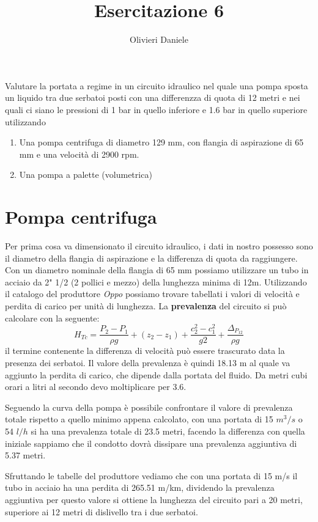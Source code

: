 \documentclass[a4paper,12pt]{article}
\title{Esercitazione 6}
\author{Olivieri Daniele}
\date{}
\begin{document}
\maketitle
Valutare la portata a regime in un circuito idraulico nel quale una pompa sposta un liquido tra due serbatoi posti con una differenzza di quota
di 12 metri e nei quali ci siano le pressioni di 1 bar in quello inferiore e 1.6 bar in quello superiore utilizzando
\begin{enumerate}
    \item Una pompa centrifuga di diametro 129 mm, con flangia di aspirazione di 65 mm e una velocità di 2900 rpm.
    \item Una pompa a palette (volumetrica)
\end{enumerate}

\section{Pompa centrifuga}
Per prima cosa va dimensionato il circuito idraulico, i dati in nostro possesso sono il diametro della flangia di aspirazione e la differenza di quota da raggiungere.
Con un diametro nominale della flangia di 65 mm possiamo utilizzare un tubo in acciaio da 2" 1/2 (2 pollici e mezzo) della lunghezza minima di 12m.
Utilizzando il catalogo del produttore \textit{Oppo} possiamo trovare tabellati i valori di velocità e perdita di carico per unità di lunghezza.
La \textbf{prevalenza} del circuito si può calcolare con la seguente:
\begin{equation}
    H_{Tc} = \frac{P_2-P_1}{\rho g} + (z_2-z_1) + \frac{c_2^2-c_1^2}{g2} + \frac{\Delta_{P_{12}}}{\rho g}
\end{equation}
il termine contenente la differenza di velocità può essere trascurato data la presenza dei serbatoi.
Il valore della prevalenza è quindi 18.13 m al quale va aggiunto la perdita di carico, che dipende dalla portata del fluido.
Da metri cubi orari a litri al secondo devo moltiplicare per 3.6.

Seguendo la curva della pompa è possibile confrontare il valore di prevalenza totale rispetto a quello minimo appena calcolato,
con una portata di 15 $m^3/s$ o 54 $l/h$ si ha una prevalenza totale di 23.5 metri, facendo la differenza con quella iniziale sappiamo che
il condotto dovrà dissipare una prevalenza aggiuntiva di 5.37 metri.

Sfruttando le tabelle del produttore vediamo che con una portata di 15 m/s il tubo in acciaio ha una perdita di 265.51 m/km, dividendo la prevalenza aggiuntiva
per questo valore si ottiene la lunghezza del circuito pari a 20 metri, superiore ai 12 metri di dislivello tra i due serbatoi.
\end{document}
